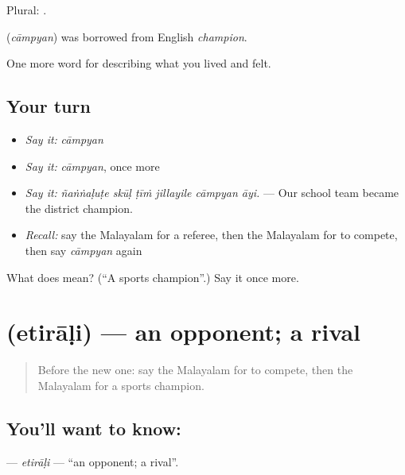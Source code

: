 Plural: .

\begin{cousinweb}
\textbf{} (\emph{cāmpyan}) was borrowed from English \emph{champion}.
\end{cousinweb}

\begin{grammarlens}[title={What you've built}]
One more word for describing what you lived and felt.
\end{grammarlens}

\subsection*{Your turn}
\begin{itemize}
\raggedright
  \item \emph{Say it:} \emph{cāmpyan}
  \item \emph{Say it:} \emph{cāmpyan}, once more
  \item \emph{Say it:} \emph{ñaṅṅaḷuṭe skūḷ ṭīṁ jillayile cāmpyan āyi.} — Our school team became the district champion.
  \item \emph{Recall:} say the Malayalam for a referee, then the Malayalam for to compete, then say \emph{cāmpyan} again
\end{itemize}

\begin{tcolorbox}[breakable,colback=teal!4,colframe=teal!35!black,title={Before you move on}]
What does  mean? (\textquotedblleft{}A sports champion\textquotedblright{}.) Say it once more.
\end{tcolorbox}
\section[\texorpdfstring{\ml{എതിരാളി} (etirāḷi)}{എതിരാളി (etirāḷi)}]{ (etirāḷi) — an opponent; a rival}

\label{lesson:ML-C569-etirali}



\begin{quote}
Before the new one: say the Malayalam for to compete, then the Malayalam for a sports champion.
\end{quote}

\subsection*{You'll want to know: }
\textbf{} — \emph{etirāḷi} — \textquotedblleft{}an opponent; a rival\textquotedblright{}.

